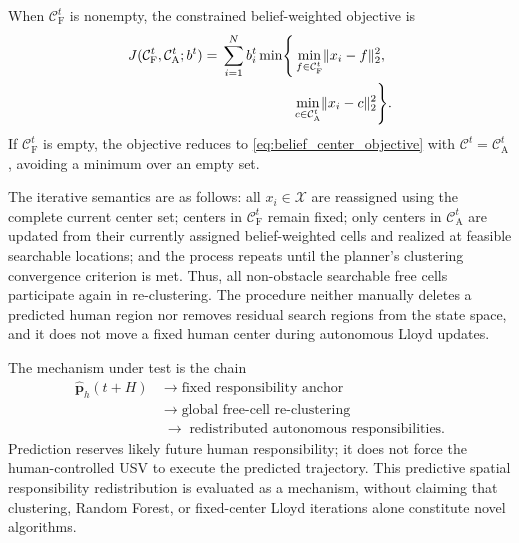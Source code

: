 \documentclass[letterpaper, 10pt, conference]{ieeeconf}
\begin{document}
When \(\mathcal{C}_{\mathrm{F}}^t\) is nonempty, the constrained belief-weighted objective is
\begin{equation}
  \begin{aligned}
    J(\mathcal{C}_{\mathrm{F}}^t,\mathcal{C}_{\mathrm{A}}^t;b^t)
    ={}& \sum_{i=1}^{N} b_i^t
    \min\!\Bigg\{
    \min_{f\in\mathcal{C}_{\mathrm{F}}^t}\lVert x_i-f\rVert_2^2,\\
    &\hspace{18mm}\min_{c\in\mathcal{C}_{\mathrm{A}}^t}\lVert x_i-c\rVert_2^2
    \Bigg\}.
  \end{aligned}
  \label{eq:fixed_center_objective}
\end{equation}
If \(\mathcal{C}_{\mathrm{F}}^t\) is empty, the objective reduces to \eqref{eq:belief_center_objective} with \(\mathcal{C}^t=\mathcal{C}_{\mathrm{A}}^t\), avoiding a minimum over an empty set.

The iterative semantics are as follows: all \(x_i\in\mathcal{X}\) are reassigned using the complete current center set; centers in \(\mathcal{C}_{\mathrm{F}}^t\) remain fixed; only centers in \(\mathcal{C}_{\mathrm{A}}^t\) are updated from their currently assigned belief-weighted cells and realized at feasible searchable locations; and the process repeats until the planner's clustering convergence criterion is met. Thus, all non-obstacle searchable free cells participate again in re-clustering. The procedure neither manually deletes a predicted human region nor removes residual search regions from the state space, and it does not move a fixed human center during autonomous Lloyd updates.

The mechanism under test is the chain
\begin{equation}
  \begin{aligned}
    \hat{\mathbf{p}}_h(t+H)
    &\;\longrightarrow\; \text{fixed responsibility anchor} \\
    &\;\longrightarrow\; \text{global free-cell re-clustering} \\
    &\;\longrightarrow\; \text{redistributed autonomous responsibilities}.
  \end{aligned}
  \label{eq:predictive_responsibility_chain}
\end{equation}
Prediction reserves likely future human responsibility; it does not force the human-controlled USV to execute the predicted trajectory. This predictive spatial responsibility redistribution is evaluated as a mechanism, without claiming that clustering, Random Forest, or fixed-center Lloyd iterations alone constitute novel algorithms.
\end{document}
